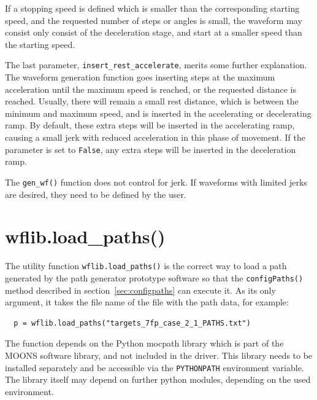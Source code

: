 \documentclass[fontsize=12,a4paper]{scrreprt}
\begin{document}
If a stopping speed is defined which is smaller than the corresponding
starting speed, and the requested number of steps or angles is small,
the waveform may consist only consist of the deceleration stage, and
start at a smaller speed than the starting speed.



The last parameter, \texttt{insert\_rest\_accelerate}, merits some
further explanation. The waveform generation function goes inserting
steps at the maximum acceleration until the maximum speed is reached,
or the requested distance is reached. Usually, there will remain a
small rest distance, which is between the minimum and maximum speed,
and is inserted in the accelerating or decelerating ramp.  By default,
these extra steps will be inserted in the accelerating ramp, causing a
small jerk with reduced acceleration in this phase of movement. If the
parameter is set to \texttt{False}, any extra steps will be inserted in
the deceleration ramp.

The \texttt{gen\_wf()} function does not control for jerk. If
waveforms with limited jerks are desired, they need to be defined by
the user.




\section{wflib.load\_paths()}
%
%
%
%
The utility function \texttt{wflib.load\_paths()} is the correct way
to load a path generated by the path generator prototype software so
that the \texttt{configPaths()} method described in
section~\ref{sec:configpaths} can execute it. As its only
argument, it takes the file name of the file with the path
data, for example:

\begin{verbatim}
  p = wflib.load_paths("targets_7fp_case_2_1_PATHS.txt")
\end{verbatim}

The function depends on the Python mocpath library which is part of
the MOONS software library, and not included in the driver.  This
library needs to be installed separately and be accessible via the
\texttt{PYTHONPATH} environment variable. The library itself may
depend on further python modules, depending on the used environment.

%
\end{document}
